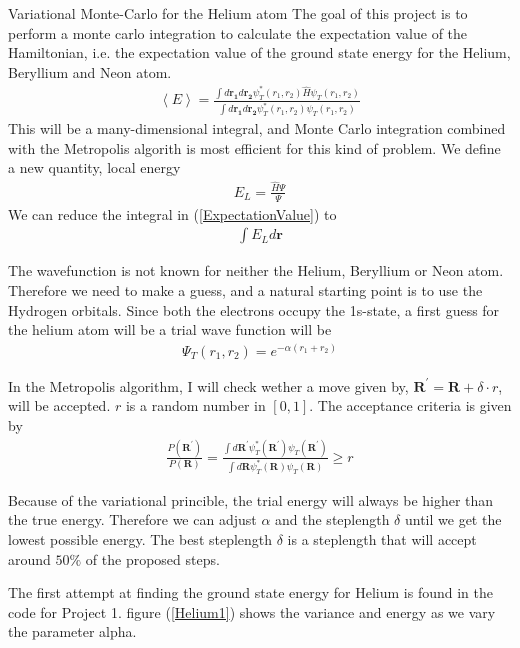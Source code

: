 \documentclass[a4paper, 12pt, titlepage]{article}
\begin{document}
 \begin{section}{Variational Monte-Carlo for the Helium atom}
 The goal of this project is to perform a monte carlo integration to calculate the expectation value of the Hamiltonian, i.e. the expectation value of the ground state energy for the Helium, Beryllium and Neon atom.  
 \begin{align}
 	\left< E \right> = \frac{\int d \mathbf{r_1} d \mathbf{r_2} \psi_T^*(r_1,r_2) \hat H \psi_T(r_1,r_2)}{\int d \mathbf{r_1} d \mathbf{r_2} \psi_T^*(r_1,r_2) \psi_T(r_1,r_2)}
 	\label{ExpectationValue}
 \end{align}
 This will be a many-dimensional integral, and Monte Carlo integration combined with the Metropolis algorith is most efficient for this kind of problem. We define a new quantity, local energy
 \begin{align*}
 	E_L = \frac{\hat H \Psi}{\Psi}
 \end{align*}
 We can reduce the integral in (\ref{ExpectationValue}) to 
 \begin{align}
 	\int E_L d \mathbf{r} 
 \end{align}

 The wavefunction is not known for neither the Helium, Beryllium or Neon atom. Therefore we need to make a guess, and a natural starting point is to use the Hydrogen orbitals. Since both the electrons occupy the 1s-state, a first guess for the helium atom will be a trial wave function will be
 \begin{align*}
 	\Psi_T(r_1,r_2) = e^{-\alpha(r_1 + r_2)}
 \end{align*}

 In the Metropolis algorithm, I will check wether a move given by, $\mathbf{R^{'}} = \mathbf{R} + \delta \cdot r $, will be accepted. $r$ is a random number in $[0,1]$. The acceptance criteria is given by
 \begin{align*}
 	\frac{P(\mathbf{R^{'}} )}{P(\mathbf{R} )} = \frac{\int d \mathbf{R^{'}} \psi^*_T(\mathbf{R^{'}} ) \psi_T(\mathbf{R^{'}} )}{\int d \mathbf{R} \psi^*_T(\mathbf{R}) \psi_T(\mathbf{R} )} \geq r
 \end{align*}

 Because of the variational princible, the trial energy will always be higher than the true energy. Therefore we can adjust $\alpha$ and the steplength $\delta$ until we get the lowest possible energy. The best steplength $\delta$ is a steplength that will accept around $50\%$ of the proposed steps. 

 The first attempt at finding the ground state energy for Helium is found in the code for Project 1. figure (\ref{Helium1}) shows the variance and energy as we vary the parameter alpha. 


\end{section}
\end{document}
